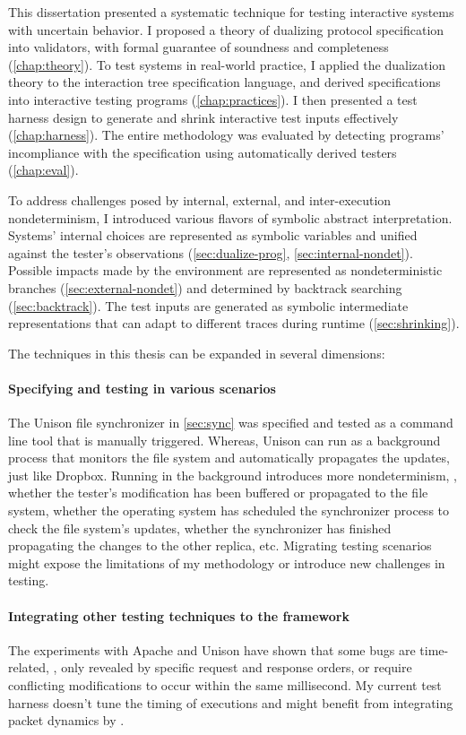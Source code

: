 This dissertation presented a systematic technique for testing interactive systems
with uncertain behavior.  I proposed a theory of dualizing protocol
specification into validators, with formal guarantee of soundness and
completeness (\autoref{chap:theory}).  To test systems in real-world practice, I
applied the dualization theory to the interaction tree specification language,
and derived specifications into interactive testing programs
(\autoref{chap:practices}).  I then presented a test harness design to generate
and shrink interactive test inputs effectively (\autoref{chap:harness}).  The
entire methodology was evaluated by detecting programs' incompliance with the
specification using automatically derived testers (\autoref{chap:eval}).

To address challenges posed by internal, external, and inter-execution
nondeterminism, I introduced various flavors of symbolic abstract
interpretation.  Systems' internal choices are represented as symbolic variables
and unified against the tester's observations (\autoref{sec:dualize-prog},
\autoref{sec:internal-nondet}).  Possible impacts made by the environment are
represented as nondeterministic branches (\autoref{sec:external-nondet}) and
determined by backtrack searching (\autoref{sec:backtrack}).  The test inputs
are generated as symbolic intermediate representations that can adapt to
different traces during runtime (\autoref{sec:shrinking}).

The techniques in this thesis can be expanded in several dimensions:
\paragraph{Specifying and testing in various scenarios}
The Unison file synchronizer in \autoref{sec:sync} was specified and tested as a
command line tool that is manually triggered.  Whereas, Unison can run as a
background process that monitors the file system and automatically propagates
the updates, just like Dropbox.  Running in the background introduces more
nondeterminism, \eg, whether the tester's modification has been buffered or
propagated to the file system, whether the operating system has scheduled the
synchronizer process to check the file system's updates, whether the
synchronizer has finished propagating the changes to the other replica, etc.
Migrating testing scenarios might expose the limitations of my
methodology or introduce new challenges in testing.

\paragraph{Integrating other testing techniques to the framework}
The experiments with Apache and Unison have shown that some bugs are
time-related, \eg, only revealed by specific request and response orders, or
require conflicting modifications to occur within the same millisecond.  My
current test harness doesn't tune the timing of executions and might benefit
from integrating packet dynamics by \citet{pkt-dyn}.

